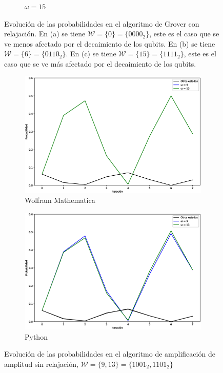 \documentclass[xetex,mathserif,serif]{beamer}
\begin{document}
\begin{frame}
\begin{figure}[H]
\begin{subfigure}[m]{0.49\textwidth}
        \caption{$\omega = 15$}
        \label{fig:groverloss1111}
    \end{subfigure}
    \caption[Evolución de las probabilidades en el algoritmo de Grover con relajación, $\mathcal{W} = \{0\}$]{Evolución de las probabilidades en el algoritmo de Grover con relajación. En (a) se tiene $\mathcal{W} = \{0\} = \{0000_2\}$, este es el caso que se ve menos afectado por el decaimiento de los qubits. En (b) se tiene $\mathcal{W} = \{6\} = \{0110_2\}$. En (c) se tiene $\mathcal{W} = \{15\} = \{1111_2\}$, este es el caso que se ve más afectado por el decaimiento de los qubits.}
    \label{fig:groverloss}
\end{figure}

\begin{figure}[H]
    \centering
    \begin{subfigure}[m]{0.49\textwidth}
        \centering
        \includegraphics[width=0.9\linewidth]{img/grover2M.eps}
        \caption{Wolfram Mathematica}
    \end{subfigure}
    \begin{subfigure}[m]{0.49\textwidth}
        \centering
        \includegraphics[width=0.9\linewidth]{img/grover2lossless.eps}
        \caption{Python}
    \end{subfigure}
    \caption[Evolución de las probabilidades en el algoritmo de amplificación de amplitud sin relajación, $\mathcal{W} = \{9, 13\}$]{Evolución de las probabilidades en el algoritmo de amplificación de amplitud sin relajación, $\mathcal{W} = \{9, 13\} = \{1001_2, 1101_2\}$}
    \label{fig:groverlosslesscomp2}
\end{figure}


\end{frame}
\end{document}
